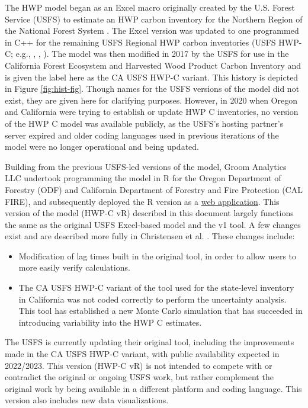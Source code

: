 \documentclass[
  openany]{book}
\providecommand{\tightlist}{%
  \setlength{\itemsep}{0pt}\setlength{\parskip}{0pt}}
\begin{document}
The HWP model began as an Excel macro originally created by the U.S. Forest Service (USFS) to estimate an HWP carbon inventory for the Northern Region of the National Forest System \autocite{stockmann2012,anderson2013}. The Excel version was updated to one programmed in C++ for the remaining USFS Regional HWP carbon inventories (USFS HWP-C; e.g., \textcite{butler2014nw}, \textcite{loeffler2014sr}, \textcite{stockmann2014imr}). The model was then modified in 2017 by the USFS for use in the California Forest Ecosystem and Harvested Wood Product Carbon Inventory \autocite{loeffler2019} and is given the label here as the CA USFS HWP-C variant. This history is depicted in Figure \ref{fig:hist-fig}. Though names for the USFS versions of the model did not exist, they are given here for clarifying purposes. However, in 2020 when Oregon and California were trying to establish or update HWP C inventories, no version of the HWP C model was available publicly, as the USFS's hosting partner's server expired and older coding languages used in previous iterations of the model were no longer operational and being updated.

Building from the previous USFS-led versions of the model, Groom Analytics LLC undertook programming the model in R for the Oregon Department of Forestry (ODF) and California Department of Forestry and Fire Protection (CAL FIRE), and subsequently deployed the R version as a \href{https://groomanalyticsllc.shinyapps.io/HWP-C-vR/}{web application}. This version of the model (HWP-C vR) described in this document largely functions the same as the original USFS Excel-based model and the v1 tool. A few changes exist and are described more fully in Christensen et al. \autocite*{christensen2020,christensen2021}. These changes include:

\begin{itemize}
\tightlist
\item
  Modification of lag times built in the original tool, in order to allow users to more easily verify calculations.\\
\item
  The CA USFS HWP-C variant of the tool used for the state-level inventory in California was not coded correctly to perform the uncertainty analysis. This tool has established a new Monte Carlo simulation that has succeeded in introducing variability into the HWP C estimates.
\end{itemize}

The USFS is currently updating their original tool, including the improvements made in the CA USFS HWP-C variant, with public availability expected in 2022/2023. This version (HWP-C vR) is not intended to compete with or contradict the original or ongoing USFS work, but rather complement the original work by being available in a different platform and coding language. This version also includes new data visualizations.
\end{document}
